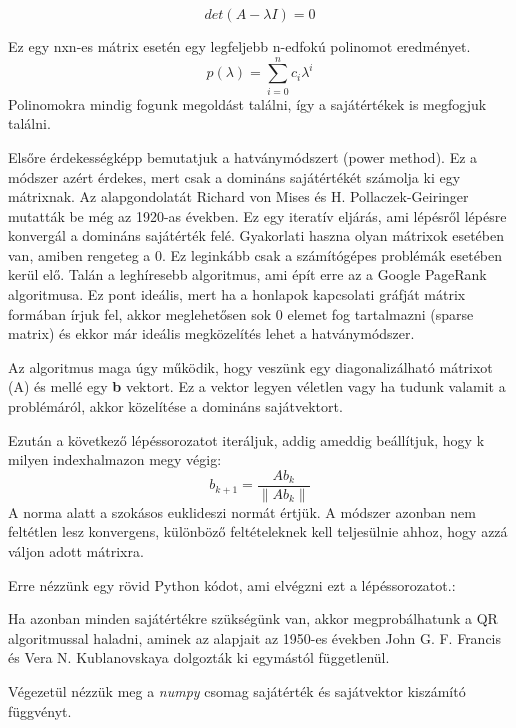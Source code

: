 \documentclass{article}
\theoremstyle{definition}
\theoremstyle{theorem}
\begin{document}
\begin{equation*}
    det(A-\lambda I) = 0
\end{equation*}

Ez egy nxn-es mátrix esetén egy legfeljebb n-edfokú polinomot eredményet.
\begin{equation*}
    p(\lambda) = \sum_{i=0}^{n} c_i \lambda^i
\end{equation*}
Polinomokra mindig fogunk megoldást találni, így a sajátértékek is megfogjuk találni.

Elsőre  érdekességképp bemutatjuk a hatványmódszert (power method). Ez a módszer azért érdekes, mert csak a domináns sajátértékét számolja ki egy mátrixnak. Az alapgondolatát Richard von Mises és H. Pollaczek-Geiringer mutatták be még az 1920-as években. Ez egy iteratív eljárás, ami lépésről lépésre konvergál a domináns sajátérték felé. Gyakorlati haszna olyan mátrixok esetében van, amiben rengeteg a 0. Ez leginkább csak a számítógépes problémák esetében kerül elő. Talán a leghíresebb algoritmus, ami épít erre az a Google PageRank algoritmusa. Ez pont ideális, mert ha a honlapok kapcsolati gráfját mátrix formában írjuk fel, akkor meglehetősen sok 0 elemet fog tartalmazni (sparse matrix) és ekkor már ideális megközelítés lehet a hatványmódszer.

Az algoritmus maga úgy működik, hogy veszünk egy diagonalizálható mátrixot (A) és mellé egy \textbf{b} vektort. Ez a vektor legyen véletlen vagy ha tudunk valamit a problémáról, akkor közelítése a domináns sajátvektort.

Ezután a következő lépéssorozatot iteráljuk, addig ameddig beállítjuk, hogy k milyen indexhalmazon megy végig:
\begin{equation*}
    b_{k+1} =\frac{A b_{k}}{\lVert A b_{k} \rVert}
\end{equation*}
A norma alatt a szokásos euklideszi normát értjük. A módszer azonban nem feltétlen lesz konvergens, különböző feltételeknek kell teljesülnie ahhoz, hogy azzá váljon adott mátrixra.

Erre nézzünk egy rövid Python kódot, ami elvégzni ezt a lépéssorozatot.:



Ha azonban minden sajátértékre szükségünk van, akkor megprobálhatunk a QR algoritmussal haladni, aminek az alapjait az 1950-es években John G. F. Francis és Vera N. Kublanovskaya dolgozták ki egymástól függetlenül.

Végezetül nézzük meg a \textit{numpy} csomag sajátérték és sajátvektor kiszámító függvényt.
\end{document}
